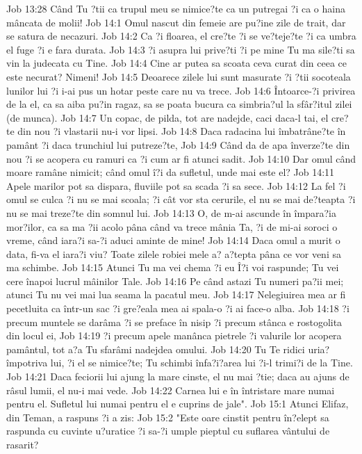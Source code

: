 Job 13:28  Când Tu ?tii ca trupul meu se nimice?te ca un putregai ?i ca o haina mâncata de molii!
Job 14:1  Omul nascut din femeie are pu?ine zile de trait, dar se satura de necazuri.
Job 14:2  Ca ?i floarea, el cre?te ?i se ve?teje?te ?i ca umbra el fuge ?i e fara durata.
Job 14:3  ?i asupra lui prive?ti ?i pe mine Tu ma sile?ti sa vin la judecata cu Tine.
Job 14:4  Cine ar putea sa scoata ceva curat din ceea ce este necurat? Nimeni!
Job 14:5  Deoarece zilele lui sunt masurate ?i ?tii socoteala lunilor lui ?i i-ai pus un hotar peste care nu va trece.
Job 14:6  Întoarce-?i privirea de la el, ca sa aiba pu?in ragaz, sa se poata bucura ca simbria?ul la sfâr?itul zilei (de munca).
Job 14:7  Un copac, de pilda, tot are nadejde, caci daca-l tai, el cre?te din nou ?i vlastarii nu-i vor lipsi.
Job 14:8  Daca radacina lui îmbatrâne?te în pamânt ?i daca trunchiul lui putreze?te,
Job 14:9  Când da de apa înverze?te din nou ?i se acopera cu ramuri ca ?i cum ar fi atunci sadit.
Job 14:10  Dar omul când moare ramâne nimicit; când omul î?i da sufletul, unde mai este el?
Job 14:11  Apele marilor pot sa dispara, fluviile pot sa scada ?i sa sece.
Job 14:12  La fel ?i omul se culca ?i nu se mai scoala; ?i cât vor sta cerurile, el nu se mai de?teapta ?i nu se mai treze?te din somnul lui.
Job 14:13  O, de m-ai ascunde în împara?ia mor?ilor, ca sa ma ?ii acolo pâna când va trece mânia Ta, ?i de mi-ai soroci o vreme, când iara?i sa-?i aduci aminte de mine!
Job 14:14  Daca omul a murit o data, fi-va el iara?i viu? Toate zilele robiei mele a? a?tepta pâna ce vor veni sa ma schimbe.
Job 14:15  Atunci Tu ma vei chema ?i eu Î?i voi raspunde; Tu vei cere înapoi lucrul mâinilor Tale.
Job 14:16  Pe când astazi Tu numeri pa?ii mei; atunci Tu nu vei mai lua seama la pacatul meu.
Job 14:17  Nelegiuirea mea ar fi pecetluita ca într-un sac ?i gre?eala mea ai spala-o ?i ai face-o alba.
Job 14:18  ?i precum muntele se darâma ?i se preface în nisip ?i precum stânca e rostogolita din locul ei,
Job 14:19  ?i precum apele manânca pietrele ?i valurile lor acopera pamântul, tot a?a Tu sfarâmi nadejdea omului.
Job 14:20  Tu Te ridici uria? împotriva lui, ?i el se nimice?te; Tu schimbi înfa?i?area lui ?i-l trimi?i de la Tine.
Job 14:21  Daca feciorii lui ajung la mare cinste, el nu mai ?tie; daca au ajuns de râsul lumii, el nu-i mai vede.
Job 14:22  Carnea lui e în întristare mare numai pentru el. Sufletul lui numai pentru el e cuprins de jale".
Job 15:1  Atunci Elifaz, din Teman, a raspuns ?i a zis:
Job 15:2  "Este oare cinstit pentru în?elept sa raspunda cu cuvinte u?uratice ?i sa-?i umple pieptul cu suflarea vântului de rasarit?
